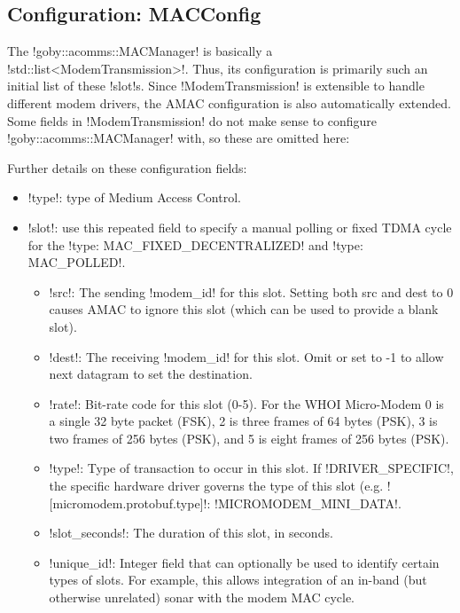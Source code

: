 \subsection{Configuration: MACConfig}

The !goby::acomms::MACManager! is basically a !std::list<ModemTransmission>!. Thus, its configuration is primarily such an initial list of these !slot!s. Since !ModemTransmission! is extensible to handle different modem drivers, the AMAC configuration is also automatically extended. Some fields in !ModemTransmission! do not make sense to configure !goby::acomms::MACManager! with, so these are omitted here:

\resetbvlinenumber


Further details on these configuration fields: 
\begin{itemize}
\item !type!: type of Medium Access Control. 
\item !slot!: use this repeated field to specify a manual polling or fixed TDMA cycle for the  !type: MAC_FIXED_DECENTRALIZED! and  !type: MAC_POLLED!. 
\begin{itemize}
\item !src!: The sending !modem_id! for this slot. Setting both src and dest to 0 causes AMAC to ignore this slot (which can be used to provide a blank slot).
\item !dest!: The receiving !modem_id! for this slot. Omit or set to -1 to allow next datagram to set the destination.
\item !rate!: Bit-rate code for this slot (0-5). For the WHOI Micro-Modem 0 is a single 32 byte packet (FSK), 2 is three frames of 64 bytes (PSK), 3 is two frames of 256 bytes (PSK), and 5 is eight frames of 256 bytes (PSK).
\item !type!: Type of transaction to occur in this slot. If !DRIVER_SPECIFIC!, the specific hardware driver governs the type of this slot (e.g. ![micromodem.protobuf.type]!: !MICROMODEM_MINI_DATA!. 
\item !slot_seconds!: The duration of this slot, in seconds.
\item !unique_id!: Integer field that can optionally be used to identify certain types of slots. For example, this allows integration of an in-band (but otherwise unrelated) sonar with the modem MAC cycle.
\end{itemize} 
\end{itemize} 

